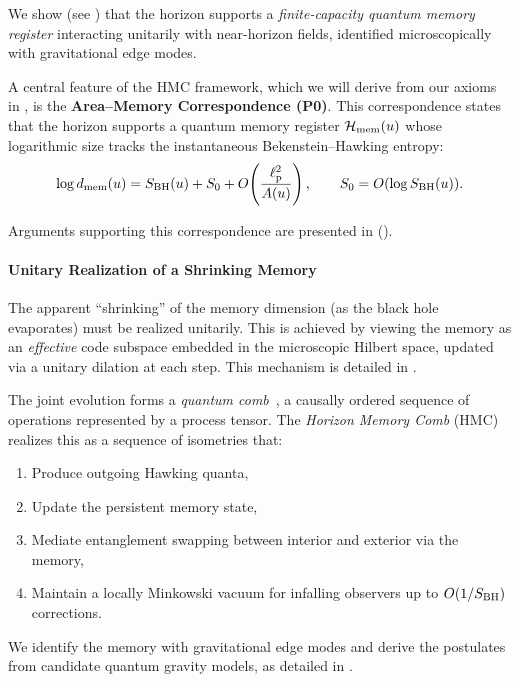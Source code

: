 \documentclass[a4paper,11pt]{article}
\newcommand{\HMC}{\textup{\textsc{HMC}}\xspace}
\theoremstyle{plain}
\theoremstyle{definition}
\theoremstyle{remark}
\begin{document}
We show (see ) that the horizon supports a \emph{finite-capacity quantum memory register} interacting unitarily with near-horizon fields, identified microscopically with gravitational edge modes.

A central feature of the \HMC{} framework, which we will derive from our axioms in , is the \textbf{Area--Memory Correspondence (P0)}. This correspondence states that the horizon supports a quantum memory register $\mathcal{H}_{\rm mem}(u)$ whose logarithmic size tracks the instantaneous Bekenstein--Hawking entropy:
\begin{equation}
    \log d_{\rm mem}(u)=S_{\rm BH}(u)+S_0+O\!\left(\frac{\ell_{\rm p}^2}{A(u)}\right),
    \qquad S_0=O(\log S_{\rm BH}(u)).
    \label{eq:mem-dim}
\end{equation}

Arguments supporting this correspondence are presented in  ().

\paragraph{Unitary Realization of a Shrinking Memory}
The apparent ``shrinking'' of the memory dimension (as the black hole evaporates) must be realized unitarily. This is achieved by viewing the memory as an \emph{effective} code subspace embedded in the microscopic Hilbert space, updated via a unitary dilation at each step. This mechanism is detailed in .

The joint evolution forms a \emph{quantum comb}~\cite{Chiribella:2009, Pollock:2018}, a causally ordered sequence of operations represented by a process tensor. The \emph{Horizon Memory Comb} (\HMC{}) realizes this as a sequence of isometries that:
\begin{enumerate}
    \item Produce outgoing Hawking quanta,
    \item Update the persistent memory state,
    \item Mediate entanglement swapping between interior and exterior via the memory,
    \item Maintain a locally Minkowski vacuum for infalling observers up to $O(1/S_{\rm BH})$ corrections.
\end{enumerate}
We identify the memory with gravitational edge modes and derive the postulates from candidate quantum gravity models, as detailed in .
\end{document}
